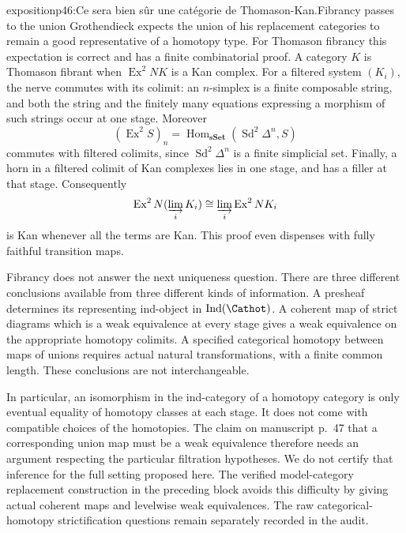 \begin{dcomment}{exposition}{p46:Ce sera bien sûr une catégorie de Thomason-Kan.}{Fibrancy passes to the union}
Grothendieck expects the union of his replacement categories to remain a good representative of a homotopy type. For Thomason fibrancy this expectation is correct and has a finite combinatorial proof. A category $K$ is Thomason fibrant when $\operatorname{Ex}^2NK$ is a Kan complex. For a filtered system $(K_i)$, the nerve commutes with its colimit: an $n$-simplex is a finite composable string, and both the string and the finitely many equations expressing a morphism of such strings occur at one stage. Moreover
\[
 (\operatorname{Ex}^2 S)_n
   =\operatorname{Hom}_{\mathbf{sSet}}(\operatorname{Sd}^2\Delta^n,S)
\]
commutes with filtered colimits, since $\operatorname{Sd}^2\Delta^n$ is a finite simplicial set. Finally, a horn in a filtered colimit of Kan complexes lies in one stage, and has a filler at that stage. Consequently
\[
 \operatorname{Ex}^2N(\varinjlim_i K_i)
       \cong\varinjlim_i\operatorname{Ex}^2NK_i
\]
is Kan whenever all the terms are Kan. This proof even dispenses with fully faithful transition maps.

Fibrancy does not answer the next uniqueness question. There are three different conclusions available from three different kinds of information. A presheaf determines its representing ind-object in $\operatorname{Ind}(\Cathot)$. A coherent map of strict diagrams which is a weak equivalence at every stage gives a weak equivalence on the appropriate homotopy colimits. A specified categorical homotopy between maps of unions requires actual natural transformations, with a finite common length. These conclusions are not interchangeable.

In particular, an isomorphism in the ind-category of a homotopy category is only eventual equality of homotopy classes at each stage. It does not come with compatible choices of the homotopies. The claim on manuscript p.~47 that a corresponding union map must be a weak equivalence therefore needs an argument respecting the particular filtration hypotheses. We do not certify that inference for the full setting proposed here. The verified model-category replacement construction in the preceding block avoids this difficulty by giving actual coherent maps and levelwise weak equivalences. The raw categorical-homotopy strictification questions remain separately recorded in the audit.
\end{dcomment}

